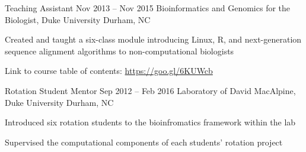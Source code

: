 

\begin{resentries}

  \resentry
    {Teaching Assistant} %
    {Nov 2013 -- Nov 2015} %
    {Bioinformatics and Genomics for the Biologist, Duke University} %
    {Durham, NC} %
    {
      \begin{cvitems} %
        \item{Created and taught a six-class module introducing Linux, R, and next-generation sequence alignment algorithms to non-computational biologists}
        \item{Link to course table of contents: \href{https://goo.gl/6KUWCb}{\color{blue} https://goo.gl/6KUWcb}}
      \end{cvitems}
    }

  \resentry
    {Rotation Student Mentor} %
    {Sep 2012 -- Feb 2016} %
    {Laboratory of David MacAlpine, Duke University} %
    {Durham, NC} %
    {
      \begin{cvitems} %
        \item{Introduced six rotation students to the bioinfromatics framework within the lab}
        \item{Supervised the computational components of each students' rotation project}
      \end{cvitems}
    }

\end{resentries}
